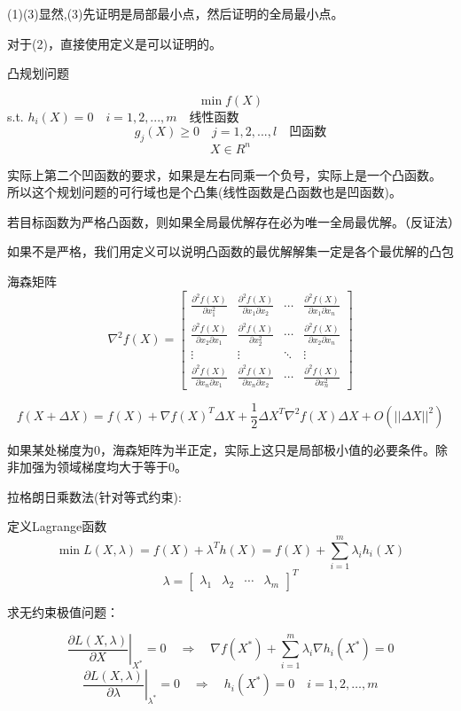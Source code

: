 \documentclass[12pt, a4paper, oneside, UTF8]{ctexbook}
\begin{document}
(1)(3)显然,(3)先证明是局部最小点，然后证明的全局最小点。

对于(2)，直接使用定义是可以证明的。

\begin{definition}
    凸规划问题

$$
\min f(X)
$$
s.t. $h_i(X) = 0 \quad i = 1, 2, ..., m \quad \text{线性函数}$
$$
g_j(X) \geq 0 \quad j = 1, 2, ..., l \quad \text{凹函数}
$$
$$
X \in R^n
$$
\end{definition}

实际上第二个凹函数的要求，如果是左右同乘一个负号，实际上是一个凸函数。
所以这个规划问题的可行域也是个凸集(线性函数是凸函数也是凹函数)。

\begin{theorem}
    若目标函数为严格凸函数，则如果全局最优解存在必为唯一全局最优解。（反证法）

    如果不是严格，我们用定义可以说明凸函数的最优解解集一定是各个最优解的凸包
\end{theorem}

\begin{definition}
    海森矩阵
    \[
    \nabla^2 f(X) = 
\begin{bmatrix}
\frac{\partial^2 f(X)}{\partial x_1^2} & \frac{\partial^2 f(X)}{\partial x_1 \partial x_2} & \cdots & \frac{\partial^2 f(X)}{\partial x_1 \partial x_n} \\
\frac{\partial^2 f(X)}{\partial x_2 \partial x_1} & \frac{\partial^2 f(X)}{\partial x_2^2} & \cdots & \frac{\partial^2 f(X)}{\partial x_2 \partial x_n} \\
\vdots & \vdots & \ddots & \vdots \\
\frac{\partial^2 f(X)}{\partial x_n \partial x_1} & \frac{\partial^2 f(X)}{\partial x_n \partial x_2} & \cdots & \frac{\partial^2 f(X)}{\partial x_n^2}
\end{bmatrix}
\]
\end{definition}

\[
f(X + \Delta X) = f(X) + \nabla f(X)^T \Delta X + \frac{1}{2} \Delta X^T \nabla^2 f(X) \Delta X + O(||\Delta X||^2)
\]

如果某处梯度为0，海森矩阵为半正定，实际上这只是局部极小值的必要条件。除非加强为领域梯度均大于等于0。

\begin{definition}
    拉格朗日乘数法(针对等式约束):

定义Lagrange函数
$$
\min L(X, \lambda) = f(X) + \lambda^T h(X) = f(X) + \sum_{i=1}^{m} \lambda_i h_i(X)
$$
$$
\lambda = \begin{bmatrix} \lambda_1 & \lambda_2 & \cdots & \lambda_m \end{bmatrix}^T
$$

求无约束极值问题：

$$
\left. \frac{\partial L(X, \lambda)}{\partial X} \right|_{X^*} = 0 \quad \Rightarrow \quad \nabla f(X^*) + \sum_{i=1}^{m} \lambda_i \nabla h_i(X^*) = 0
$$
$$
\left. \frac{\partial L(X, \lambda)}{\partial \lambda} \right|_{\lambda^*} = 0 \quad \Rightarrow \quad h_i(X^*) = 0 \quad i = 1, 2, \ldots, m
$$
\end{definition}
\end{document}
